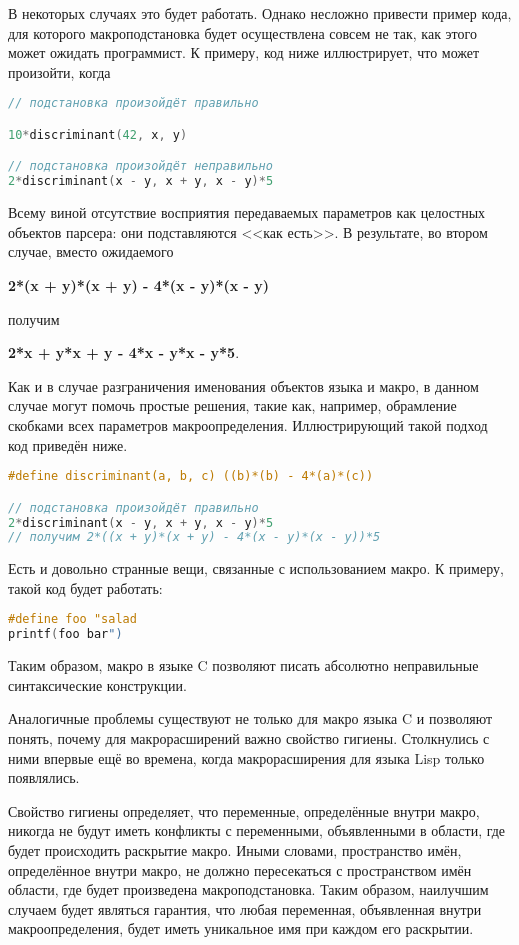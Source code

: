 В некоторых случаях это будет работать. Однако несложно привести пример кода, для которого макроподстановка будет осуществлена совсем не так, как этого может ожидать программист. К примеру, код ниже иллюстрирует, что может произойти, когда 

\begin{lstlisting}[language=C]
// подстановка произойдёт правильно

10*discriminant(42, x, y)

// подстановка произойдёт неправильно
2*discriminant(x - y, x + y, x - y)*5
\end{lstlisting}

Всему виной отсутствие восприятия передаваемых параметров как целостных объектов парсера: они подставляются <<как есть>>. В результате, во втором случае, вместо ожидаемого

\textbf{2*(x + y)*(x + y) - 4*(x - y)*(x - y)}

получим

\textbf{2*x + y*x + y - 4*x - y*x - y*5}.

Как и в случае разграничения именования объектов языка и макро, в данном случае могут помочь простые решения, такие как, например, обрамление скобками всех параметров макроопределения. Иллюстрирующий такой подход код приведён ниже.

\begin{lstlisting}[language=C]
#define discriminant(a, b, c) ((b)*(b) - 4*(a)*(c))

// подстановка произойдёт правильно
2*discriminant(x - y, x + y, x - y)*5
// получим 2*((x + y)*(x + y) - 4*(x - y)*(x - y))*5
\end{lstlisting}

Есть и довольно странные вещи, связанные с использованием макро. К примеру, такой код будет работать:

\begin{lstlisting}[language=C]
#define foo "salad
printf(foo bar")
\end{lstlisting}

Таким образом, макро в языке C позволяют писать абсолютно неправильные синтаксические конструкции.

Аналогичные проблемы существуют не только для макро языка C и позволяют понять, почему для макрорасширений важно свойство гигиены. Столкнулись с ними впервые ещё во времена, когда макрорасширения для языка Lisp только появлялись\cite{Skalski:2005}.

Свойство гигиены определяет, что переменные, определённые внутри макро, никогда не будут иметь конфликты с переменными, объявленными в области, где будет происходить раскрытие макро. Иными словами, пространство имён, определённое внутри макро, не должно пересекаться с пространством имён области, где будет произведена макроподстановка. Таким образом, наилучшим случаем будет являться гарантия, что любая переменная, объявленная внутри макроопределения, будет иметь уникальное имя при каждом его раскрытии.

